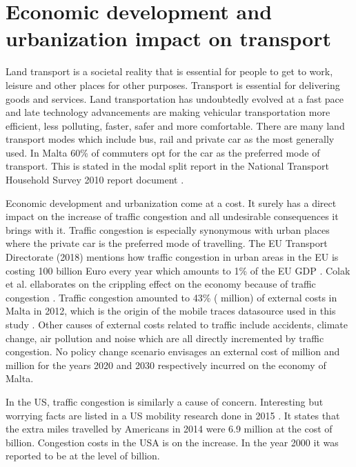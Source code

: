 \documentclass[12pt, a4paper]{report}
\theoremstyle{definition}
\theoremstyle{definition}%
\theoremstyle{definition}%
\theoremstyle{definition}%
\theoremstyle{definition}%
\theoremstyle{definition}%
\begin{document}
\section{Economic development and urbanization impact on transport} \label{section:introduction:economic_development}

Land transport is a societal reality that is essential for people to get to work, leisure and other places for other purposes. Transport is essential for delivering goods and services. Land transportation has undoubtedly evolved at a fast pace and late technology advancements are making vehicular transportation more efficient, less polluting, faster, safer and more comfortable. There are many land transport modes which include bus, rail and private car as the most generally used. In Malta 60\% of commuters opt for the car as the preferred mode of transport. This is stated in the modal split report in the National Transport Household Survey 2010 report document  \cite{malta2011national}.

Economic development and urbanization come at a cost. It surely has a direct impact on the increase of traffic congestion and all undesirable consequences it brings with it. Traffic congestion is especially synonymous with urban places where the private car is the preferred mode of travelling. The EU Transport Directorate (2018) mentions how traffic congestion in urban areas in the EU is costing 100 billion Euro every year which amounts to 1\% of the EU GDP \cite{EUTransportDirectorate2018}. Colak et al. ellaborates on the crippling effect on the economy because of traffic congestion \cite{Colak2015}. Traffic congestion amounted to 43\% ( million) of external costs in Malta in 2012, which is the origin of the mobile traces datasource used in this study \cite{Attard2015}. Other causes of external costs related to traffic include accidents, climate change, air pollution and noise which are all directly incremented by traffic congestion. No policy change scenario envisages an external cost of  million and  million for the years 2020 and 2030 respectively incurred on the economy of Malta.

In the US, traffic congestion is similarly a cause of concern. Interesting but worrying facts are listed in a US mobility research done in 2015 \cite{Schrank.2015}. It states that the extra miles travelled by Americans in 2014 were 6.9 million at the cost of  billion. Congestion costs in the USA is on the increase. In the year 2000 it was reported to be at the level of  billion.
\end{document}
